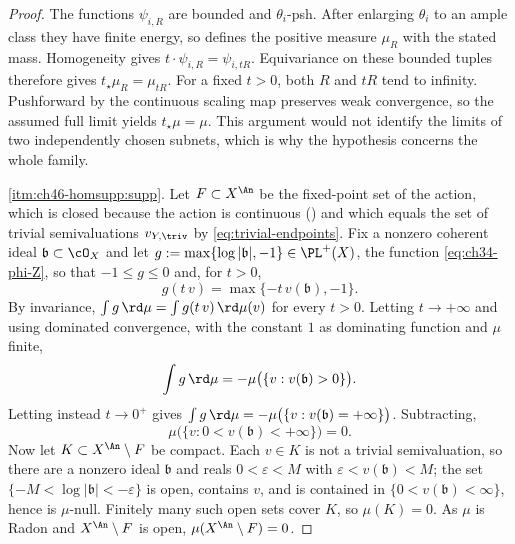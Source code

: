 \begin{proof}
The functions $\psi_{i,R}$ are bounded and $\theta_i$-psh. After enlarging
$\theta_i$ to an ample class they have finite energy, so
 defines the positive measure $\mu_R$ with the
stated mass. Homogeneity gives
$t\cdot\psi_{i,R}=\psi_{i,tR}$. Equivariance on these bounded tuples
therefore gives $t_\star\mu_R=\mu_{tR}$.
For a fixed $t>0$, both $R$ and $tR$ tend to infinity. Pushforward by
the continuous scaling map preserves weak convergence, so the assumed
full limit yields $t_\star\mu=\mu$.
This argument would not identify the limits of two independently chosen
subnets, which is why the hypothesis concerns the whole family.

\cref{itm:ch46-homsupp:supp}.  Let $F\subset X^{\An}$ be the fixed-point
set of the action, which is closed because the action is continuous
() and which equals the set of trivial
semivaluations $v_{Y,\triv}$ by \eqref{eq:trivial-endpoints}.  Fix a
nonzero coherent ideal $\mathfrak b\subset\cO_X$ and let
$g:=\max\{\log|\mathfrak b|,-1\}\in\PL^+(X)$, the function
\eqref{eq:ch34-phi-Z}, so that $-1\le g\le0$ and, for $t>0$,
\[
 g(t\,v)=\max\{-t\,v(\mathfrak b),-1\}.
\]
By invariance, $\int g\,\rd\mu=\int g(t\,v)\,\rd\mu(v)$ for every
$t>0$.  Letting $t\to+\infty$ and using dominated convergence, with the
constant $1$ as dominating function and $\mu$ finite,
\[
 \int g\,\rd\mu=-\mu\bigl(\{v:v(\mathfrak b)>0\}\bigr).
\]
Letting instead $t\to0^+$ gives
$\int g\,\rd\mu=-\mu\bigl(\{v:v(\mathfrak b)=+\infty\}\bigr)$.
Subtracting,
\[
 \mu\bigl(\{v:0<v(\mathfrak b)<+\infty\}\bigr)=0 .
\]
Now let $K\subset X^{\An}\setminus F$ be compact.  Each $v\in K$ is not
a trivial semivaluation, so there are a nonzero ideal $\mathfrak b$ and
reals $0<\varepsilon<M$ with $\varepsilon<v(\mathfrak b)<M$; the set
$\{-M<\log|\mathfrak b|<-\varepsilon\}$ is open, contains $v$, and is
contained in $\{0<v(\mathfrak b)<\infty\}$, hence is $\mu$-null.
Finitely many such open sets cover $K$, so $\mu(K)=0$.  As $\mu$ is
Radon and $X^{\An}\setminus F$ is open, $\mu(X^{\An}\setminus F)=0$.
\end{proof}


